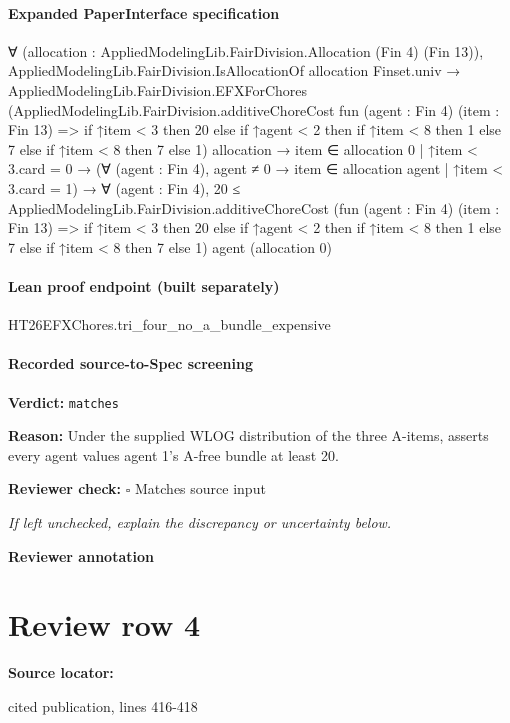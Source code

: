 \documentclass[10pt]{article}
\newcommand{\reviewerbox}{%
  \par\noindent\fbox{\parbox{0.96\linewidth}{\rule{0pt}{0.38in}}}\par
}
\newcommand{\reviewmatch}[1]{%
  \par\noindent\textbf{Reviewer check:} $\square$\; #1\par
  \noindent\emph{If left unchecked, explain the discrepancy or uncertainty below.}\par
}
\begin{document}
\paragraph{Expanded PaperInterface specification}
\begin{ReviewVerbatim}
∀ (allocation : AppliedModelingLib.FairDivision.Allocation (Fin 4) (Fin 13)),
  AppliedModelingLib.FairDivision.IsAllocationOf allocation Finset.univ →
    AppliedModelingLib.FairDivision.EFXForChores
        (AppliedModelingLib.FairDivision.additiveChoreCost fun (agent : Fin 4) (item : Fin 13) =>
          if ↑item < 3 then 20 else if ↑agent < 2 then if ↑item < 8 then 1 else 7 else if ↑item < 8 then 7 else 1)
        allocation →
      {item ∈ allocation 0 | ↑item < 3}.card = 0 →
        (∀ (agent : Fin 4), agent ≠ 0 → {item ∈ allocation agent | ↑item < 3}.card = 1) →
          ∀ (agent : Fin 4),
            20 ≤
              AppliedModelingLib.FairDivision.additiveChoreCost
                (fun (agent : Fin 4) (item : Fin 13) =>
                  if ↑item < 3 then 20
                  else if ↑agent < 2 then if ↑item < 8 then 1 else 7 else if ↑item < 8 then 7 else 1)
                agent (allocation 0)
\end{ReviewVerbatim}



\paragraph{Lean proof endpoint (built separately)}\begin{ReviewVerbatim}
HT26EFXChores.tri_four_no_a_bundle_expensive
\end{ReviewVerbatim}

\paragraph{Recorded source-to-Spec screening}
\textbf{Verdict:} \texttt{matches}
\\
{\raggedright
\textbf{Reason:} Under the supplied WLOG distribution of the three A-\allowbreak{}items, asserts every agent values agent 1's A-\allowbreak{}free bundle at least 20.\allowbreak{}
\par}
\reviewmatch{Matches source input}
\noindent\textbf{Reviewer annotation}\par
\reviewerbox
\clearpage
\hypertarget{source-claim-8bed2d2e9152e71d}{}
\section*{Review row 4}
\textbf{Source locator:} {\footnotesize\raggedright cited publication, lines 416-\allowbreak{}418\par}
\end{document}
